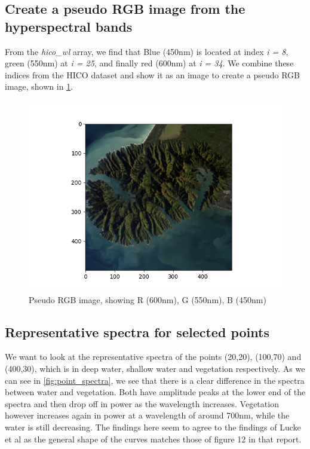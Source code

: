 \subsection{Create a pseudo RGB image from the hyperspectral bands}

From the \textit{hico\_wl} array, we find that Blue (450nm) is located at index \textit{i = 8}, 
green (550nm) at \textit{i = 25}, and finally red (600nm) at \textit{i = 34}. We combine these indices from 
the HICO dataset and show it as an image to create a pseudo RGB image, shown in \cref{fig:pseudo_rgb}.


\begin{figure}
    \centering
    \includegraphics[width=\textwidth]{../fig/pseudo_rgb.png}
    \caption{Pseudo RGB image, showing R (600nm), G (550nm), B (450nm)}
    \label{fig:pseudo_rgb}
\end{figure}

\subsection{Representative spectra for selected points}

We want to look at the representative spectra of the points (20,20), (100,70) and (400,30), which is in deep water, shallow water 
and vegetation respectively.
As we can see in \cref{fig:point_spectra}, we see that there is a clear difference in the spectra between water and vegetation. 
Both have amplitude peaks at the lower end of the spectra and then drop off in power as the wavelength increases. Vegetation however increases
again in power at a wavelength of around 700nm, while the water is still decreasing. 
The findings here seem to agree to the findings of Lucke et al \cite{Lucke:11} as the general shape of the curves matches those of figure 12 in 
that report. 

